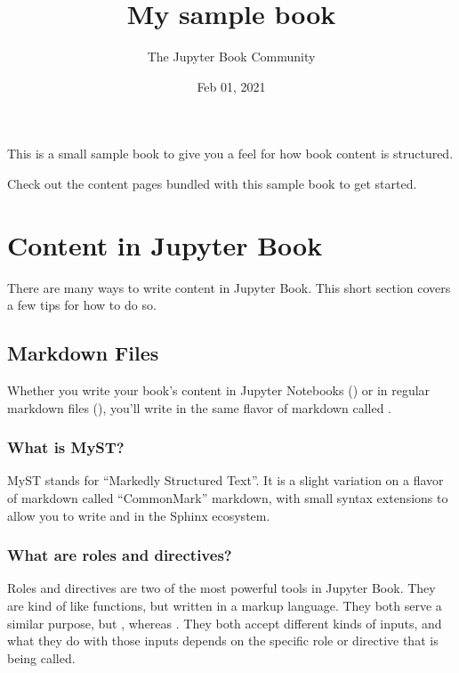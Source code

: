 \documentclass[letterpaper,10pt,english]{sphinxmanual}
\title{My sample book}
\date{Feb 01, 2021}
\author{The Jupyter Book Community}
\begin{document}
\pagestyle{empty}
\sphinxmaketitle
\pagestyle{plain}
\sphinxtableofcontents
\pagestyle{normal}
\label{\detokenize{intro::doc}}


This is a small sample book to give you a feel for how book content is
structured.

Check out the content pages bundled with this sample book to get started.


\chapter{Content in Jupyter Book}
\label{\detokenize{content:content-in-jupyter-book}}\label{\detokenize{content::doc}}
There are many ways to write content in Jupyter Book. This short section
covers a few tips for how to do so.


\section{Markdown Files}
\label{\detokenize{markdown:markdown-files}}\label{\detokenize{markdown::doc}}
Whether you write your book’s content in Jupyter Notebooks () or
in regular markdown files (), you’ll write in the same flavor of markdown
called .


\subsection{What is MyST?}
\label{\detokenize{markdown:what-is-myst}}
MyST stands for “Markedly Structured Text”. It
is a slight variation on a flavor of markdown called “CommonMark” markdown,
with small syntax extensions to allow you to write  and 
in the Sphinx ecosystem.


\subsection{What are roles and directives?}
\label{\detokenize{markdown:what-are-roles-and-directives}}
Roles and directives are two of the most powerful tools in Jupyter Book. They
are kind of like functions, but written in a markup language. They both
serve a similar purpose, but , whereas
. They both accept different kinds of inputs,
and what they do with those inputs depends on the specific role or directive
that is being called.
\end{document}
